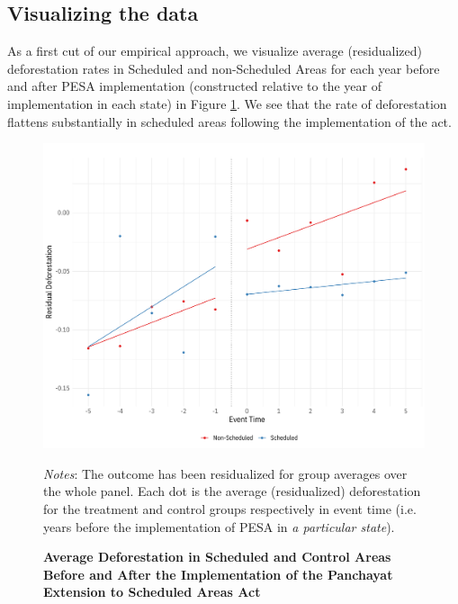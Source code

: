 \documentclass[12pt,reqno]{article}
\begin{document}
\subsection{Visualizing the data}
As a first cut of our empirical approach, we visualize average (residualized) deforestation rates in Scheduled and non-Scheduled Areas for each year before and after PESA implementation (constructed relative to the year of implementation in each state) in Figure \ref{fig:schtrends}. We see that the rate of deforestation flattens substantially in scheduled areas following the implementation of the act.



\begin{figure}[htbp!]
\begin{center}
\begin{minipage}{1 \linewidth}
 \caption{\textbf{Average Deforestation in Scheduled and Control Areas Before and After the Implementation of the Panchayat Extension to Scheduled Areas Act} \label{fig:schtrends}}	
\centerline{\includegraphics[width=5 in,angle=0]{Output/levels_time_trends.pdf}}
\smallskip
\normalsize
\emph{Notes}: The outcome has been residualized for group averages over the whole panel. Each dot is the average (residualized) deforestation for the treatment and control groups respectively in event time (i.e. years before the implementation of PESA in \emph{a particular state}).
\end{minipage}
\end{center}
\end{figure}
\end{document}
